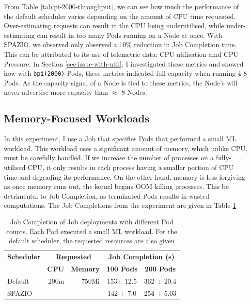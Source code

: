 From Table \ref{tab:pi-2000-throughput}, we can see how much the performance of
the default scheduler varies depending on the amount of CPU time requested.
Over-estimating requests can result in the CPU being underutilised, while
under-estimating can result in too many Pods running on a Node at once. With
SPAZIO, we observed only observed a 10\% reduction in Job Completion time. This
can be attributed to its use of telemetric data: CPU utilisation amd CPU
Pressure. In Section \ref{sec:issue-with-util}, I investigated these metrics and
showed how with \texttt{bpi(2000)} Pods, these metrics indicated full capacity
when running 4-8 Pods. As the capacity signal of a Node is tied to these
metrics, the Node's will never advertise more capacity than $\approx$ 8 Nodes.

\subsection{Memory-Focused Workloads}
In this experiment, I use a Job that specifies Pods that performed a small ML
workload. This workload uses a significant amount of memory, which unlike CPU,
must be carefully handled. If we increase the number of processes on a
fully-utilised CPU, it only results in each process having a smaller portion of
CPU time and degrading its performance. On the other hand, memory is less
forgiving as once memory runs out, the kernel begins OOM killing processes. This
be detrimental to Job Completion, as terminated Pods results in wasted
computations. The Job Completions from the experiment are given in Table
\ref{tab:ml-throughput}

\begin{table}[H]
\centering
    \begin{tabular}{|l|r|r|c|c|}
    \hline
    \textbf{Scheduler} & \multicolumn{2}{c|}{\textbf{Requested}} &
        \multicolumn{2}{c|}{\textbf{Job Completion (s)}} \\ \cline{2-5}
    &  \textbf{CPU} & \textbf{Memory} & \textbf{100 Pods} & \textbf{200 Pods} \\
    \hline
        Default & 200m & 750Mi & 153$\pm$ 12.5 & 362 $\pm$ 20.4\\
        SPAZIO &  &  & 142 $\pm$ 7.0 & 254 $\pm$ 5.03 \\
    \hline
    \end{tabular}
    \caption{Job Completion of Job deployments with different Pod counts. Each
    Pod executed a small ML workload. For the default scheduler, the requested
    resources are also given}
    \label{tab:ml-throughput}
\end{table}

